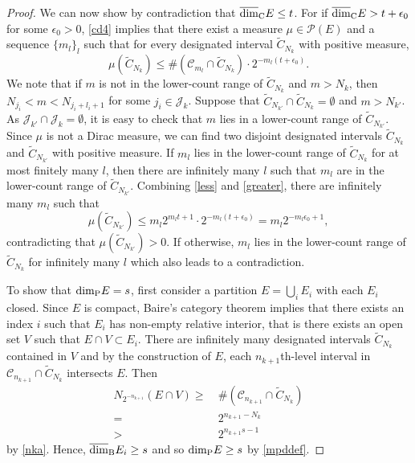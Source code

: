\documentclass[12pt]{article}
\newcommand{\1}{{\bf 1}}
\newcommand\ucod{\overline{\mbox{\rm dim}}_{\rm C}} %
\newcommand\ubd{\overline{\mbox{\rm dim}}_{\rm B}} %
\newcommand\pkd{\mbox{\rm dim}_{\rm P}} %
\begin{document}
\begin{proof}
		We can now show by contradiction that $\ucod E\leq t$.  For if   $\ucod E > t+\epsilon_0$ for some $\epsilon_0>0$,   \eqref{cd4} implies that there exist a measure $\mu\in\mathcal{P}(E)$ and a sequence $\{m_l\}_l$  such that for every  designated interval  $\widetilde{C}_{N_k}$ with positive measure,  
		\begin{equation}\label{greater}
			\mu( \widetilde{C}_{N_k})\leq\#(\mathcal{C}_{m_l}\cap \widetilde{C}_{N_k})\cdot2^{-m_l(t+\epsilon_0)}.
		\end{equation}
We note that if $m$ is not in the lower-count range of $\widetilde{C}_{N_k}$ and $m>N_k$, then $N_{j_i}<m<N_{j_i+l_i+1}$ for some $j_i\in\mathcal{J}_k$.
	Suppose that $\widetilde{C}_{N_{k'}}\cap \widetilde{C}_{N_{k}}=\emptyset$ and $m>N_{k'}$. As $\mathcal{J}_{k'}\cap \mathcal{J}_k=\emptyset$,  it is easy to check that $m$ lies in a lower-count range of $\widetilde{C}_{N_{k'}}$.  Since $\mu$ is not a Dirac measure, we can find two   disjoint designated intervals $ \widetilde{C}_{N_{k}}$ and $\widetilde{C}_{N_{k'}}$  with positive measure. 
	If $m_l$ lies in the  lower-count range of $ \widetilde{C}_{N_{k}}$  for at most finitely many $l$,  then there are infinitely many $l$ such that $m_l$  are in the lower-count range of $ \widetilde{C}_{N_{k'}}$. 
	Combining \eqref{less} and \eqref{greater}, there are infinitely many $m_l$ such that 
	$$\mu( \widetilde{C}_{N_{k'}})\leq   m_l2^{m_lt+1}\cdot2^{-m_l(t+\epsilon_0)} = m_l2^{-m_l\epsilon_0+1},$$
	contradicting that $\mu(\widetilde{C}_{N_{k'}})>0$. If otherwise, $m_l$ lies in the  lower-count range of $ \widetilde{C}_{N_{k}}$  for infinitely many $l$ which also leads to a contradiction.


		 To show that $\pkd E=s$, first consider a partition $E=\bigcup_i E_i$ with each $E_i$  closed. Since $E$ is compact, Baire's category theorem implies that there exists an index $i$ such that $E_i$ has non-empty relative interior, that is there exists an open set $V$ such that $E\cap V\subset  E_i$.
		There are infinitely many  designated intervals $\widetilde{C}_{N_k}$ contained in $V$ and by the construction of $E$,  each $n_{k+1}$th-level interval in $\mathcal{C}_{n_{k+1}}\cap \widetilde{C}_{N_k}$  intersects $E$. Then
		\begin{align*}
			N_{2^{-n_{k+1}}}(E\cap V)\geq&\  \#(\mathcal{C}_{n_{k+1}}\cap \widetilde{C}_{N_k})\\
			=&\ 2^{n_{k+1}-N_k}\\
			>&\ 2^{n_{k+1}s-1}
		\end{align*} 
by \eqref{nka}.	Hence, $\ubd E_i\geq s$ and so  $\pkd E\geq s$ by \eqref{mpddef}.
		

\end{proof}
\end{document}
